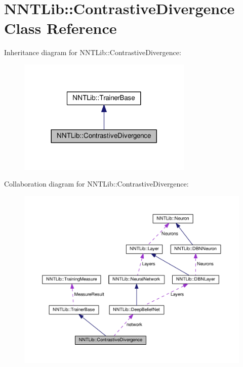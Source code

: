 \hypertarget{class_n_n_t_lib_1_1_contrastive_divergence}{}\section{N\+N\+T\+Lib\+:\+:Contrastive\+Divergence Class Reference}
\label{class_n_n_t_lib_1_1_contrastive_divergence}


Inheritance diagram for N\+N\+T\+Lib\+:\+:Contrastive\+Divergence\+:\nopagebreak
\begin{figure}[H]
\begin{center}
\leavevmode
\includegraphics[width=236pt]{class_n_n_t_lib_1_1_contrastive_divergence__inherit__graph}
\end{center}
\end{figure}


Collaboration diagram for N\+N\+T\+Lib\+:\+:Contrastive\+Divergence\+:\nopagebreak
\begin{figure}[H]
\begin{center}
\leavevmode
\includegraphics[width=350pt]{class_n_n_t_lib_1_1_contrastive_divergence__coll__graph}
\end{center}
\end{figure}
